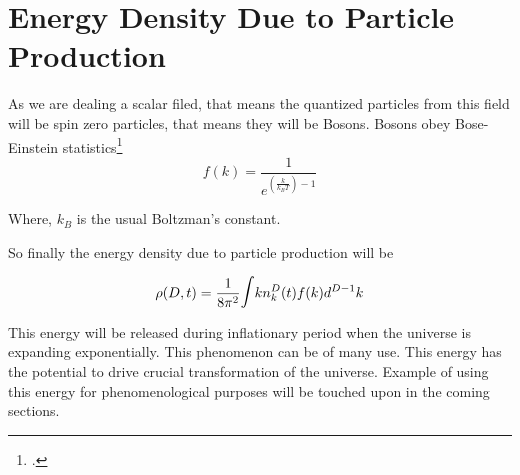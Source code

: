 \section{Energy Density Due to Particle Production}

As we are dealing a scalar filed, that means the quantized particles from this field will be spin zero particles, that means they will be Bosons. Bosons obey Bose-Einstein statistics\footcite[][(p221)]{landau:1958}
\begin{equation}
f(k) = \frac{1}{e^{(\frac{k}{k_BT})-1}}
\end{equation}

Where, $k_B$ is the usual Boltzman's constant.

So finally the energy density due to particle production will be

\begin{equation}
\rho(D,t) = \frac{1}{8\pi^2} \mathlarger{\mathlarger{\int}}kn^D_k(t)f(k)d^{D-1}k
\end{equation}

This energy will be released during inflationary period when the universe is expanding exponentially. This phenomenon can be of many use. This energy has the potential to drive crucial transformation of the universe. Example of using this energy for phenomenological purposes will be touched upon in the coming sections.